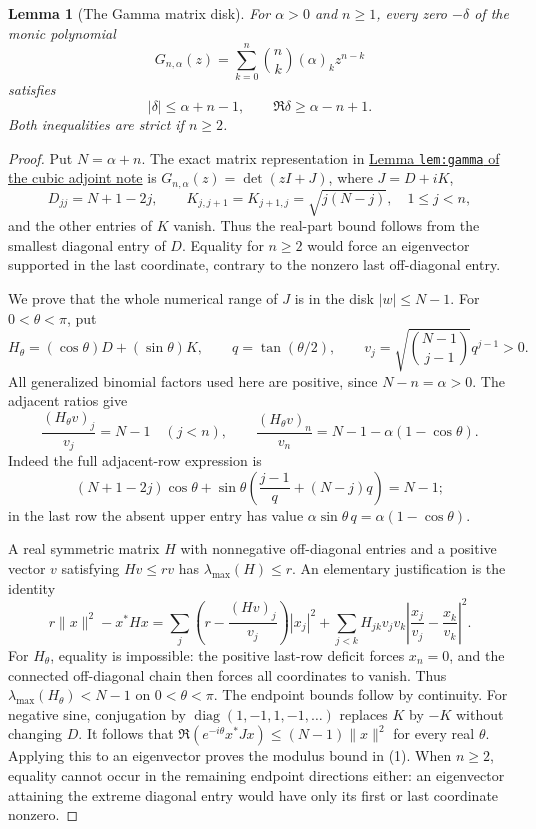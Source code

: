 \documentclass[11pt]{article}
\newtheorem{lemma}{Lemma}\newtheorem{theorem}{Theorem}
\begin{document}
\begin{lemma}[The Gamma matrix disk]\label{lem:gamma-disk}
For $\alpha>0$ and $n\ge1$, every zero $-\delta$ of the monic polynomial
\[
G_{n,\alpha}(z)=\sum_{k=0}^n\binom nk(\alpha)_kz^{n-k}
\]
satisfies
\[
 |\delta|\le\alpha+n-1,\qquad \Re\delta\ge\alpha-n+1.             \tag{1}
\]
Both inequalities are strict if $n\ge2$.
\end{lemma}
\begin{proof}
Put $N=\alpha+n$.  The exact matrix representation in
\href{CUBIC_ADJOINT_STABILITY_SFC.tex}
{Lemma \texttt{lem:gamma} of the cubic adjoint note} is
$G_{n,\alpha}(z)=\det(zI+J)$, where $J=D+iK$,
\[
D_{jj}=N+1-2j,\qquad
K_{j,j+1}=K_{j+1,j}=\sqrt{j(N-j)},\quad 1\le j<n,
\]
and the other entries of $K$ vanish.
Thus the real-part bound follows from the smallest diagonal
entry of $D$.  Equality for $n\ge2$ would force an eigenvector
supported in the last coordinate, contrary to the nonzero last
off-diagonal entry.

We prove that the whole numerical range of $J$ is in the disk
$|w|\le N-1$.  For $0<\theta<\pi$, put
\[
 H_\theta=(\cos\theta)D+(\sin\theta)K,\qquad
 q=\tan(\theta/2),\qquad
 v_j=\sqrt{\binom{N-1}{j-1}}q^{j-1}>0 .
\]
All generalized binomial factors used here are positive, since
$N-n=\alpha>0$.  The adjacent ratios give
\[
 \frac{(H_\theta v)_j}{v_j}=N-1\quad(j<n),\qquad
 \frac{(H_\theta v)_n}{v_n}
     =N-1-\alpha(1-\cos\theta).                              \tag{2}
\]
Indeed the full adjacent-row expression is
\[
 (N+1-2j)\cos\theta+
 \sin\theta\left(\frac{j-1}{q}+(N-j)q\right)=N-1;
\]
in the last row the absent upper entry has value
$\alpha\sin\theta\,q=\alpha(1-\cos\theta)$.

A real symmetric matrix $H$ with nonnegative off-diagonal entries
and a positive vector $v$ satisfying $Hv\le rv$ has
$\lambda_{\max}(H)\le r$.  An elementary justification is the identity
\[
 r\|x\|^2-x^*Hx=
 \sum_j\left(r-\frac{(Hv)_j}{v_j}\right)|x_j|^2
 +\sum_{j<k}H_{jk}v_jv_k
       \left|\frac{x_j}{v_j}-\frac{x_k}{v_k}\right|^2.
\]
For $H_\theta$, equality is impossible: the positive last-row
deficit forces $x_n=0$, and the connected off-diagonal chain
then forces all coordinates to vanish.
Thus $\lambda_{\max}(H_\theta)<N-1$ on $0<\theta<\pi$.
The endpoint bounds follow by continuity.
For negative sine, conjugation by $\operatorname{diag}(1,-1,1,-1,\ldots)$
replaces $K$ by $-K$ without changing $D$.
It follows that
$\Re(e^{-i\theta}x^*Jx)\le(N-1)\|x\|^2$ for every real $\theta$.
Applying this to an eigenvector proves the modulus bound in (1).
When $n\ge2$, equality cannot occur in the remaining endpoint
directions either: an eigenvector attaining the extreme diagonal
entry would have only its first or last coordinate nonzero.
\end{proof}
\end{document}
